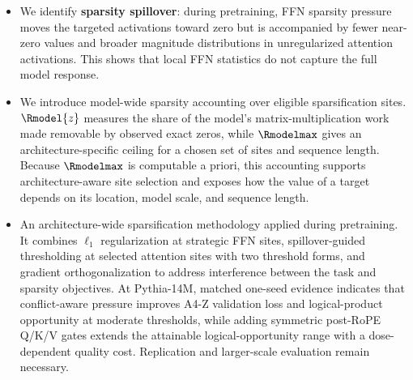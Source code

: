 \begin{itemize}
    \item We identify \textbf{sparsity spillover}: during pretraining, FFN sparsity pressure moves the targeted activations toward zero but is accompanied by fewer near-zero values and broader magnitude distributions in unregularized attention activations. This shows that local FFN statistics do not capture the full model response.

    \item We introduce model-wide sparsity accounting over eligible sparsification sites. \(\Rmodel{z}\) measures the share of the model's matrix-multiplication work made removable by observed exact zeros, while \(\Rmodelmax\) gives an architecture-specific ceiling for a chosen set of sites and sequence length. Because \(\Rmodelmax\) is computable a priori, this accounting supports architecture-aware site selection and exposes how the value of a target depends on its location, model scale, and sequence length.

    \item An architecture-wide sparsification methodology applied during pretraining. It combines \(\ell_1\) regularization at strategic FFN sites, spillover-guided thresholding at selected attention sites with two threshold forms, and gradient orthogonalization to address interference between the task and sparsity objectives. At Pythia-14M, matched one-seed evidence indicates that conflict-aware pressure improves A4-Z validation loss and logical-product opportunity at moderate thresholds, while adding symmetric post-RoPE Q/K/V gates extends the attainable logical-opportunity range with a dose-dependent quality cost. Replication and larger-scale evaluation remain necessary.
\end{itemize}
